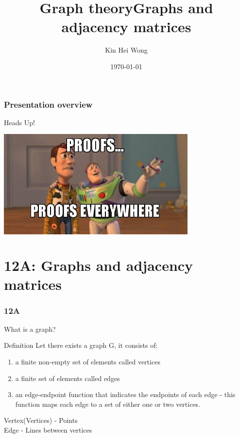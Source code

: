 \documentclass[
	11pt, %
]{beamer}
\title{Graph theory}
\author{Kin Hei Wong}
\date{\today}
\begin{document}
\begin{frame}
    \titlepage
\end{frame}

\begin{frame}
    \frametitle{Presentation overview}
    \tableofcontents
\end{frame}

\begin{frame}{Heads Up!}
    \begin{center}
        \includegraphics[width=10cm]{Proofs.jpg}
    \end{center}
\end{frame}

\section{12A: Graphs and adjacency matrices}
\begin{frame}
    \frametitle{12A}
    \begin{center}
        \title{Graphs and adjacency matrices}
        \maketitle
    \end{center}
\end{frame}

\begin{frame}{What is a graph?}
    \begin{block}{Definition}
        Let there exists a graph G, it consists of:\\
        \begin{enumerate}
            \item a finite non-empty set of elements called vertices
            \item a finite set of elements called edges
            \item an edge-endpoint function that indicates the endpoints of each edge - this function
            maps each edge to a set of either one or two vertices.
        \end{enumerate}
    \end{block}
    \bigskip
    Vertex(Vertices) - Points\\
    Edge - Lines between vertices\\
\end{frame}
\end{document}
